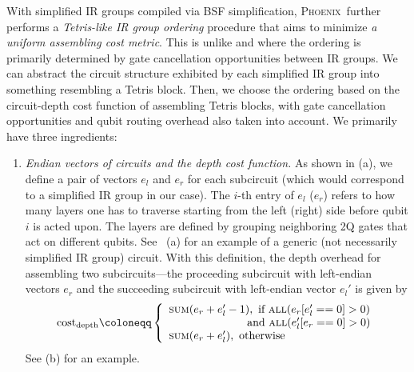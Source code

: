 \documentclass[conference,9pt]{IEEEtran}
\newcommand{\phoenix}{\textsc{Phoenix}}
\newcommand{\eRrightPre}{e_r}
\newcommand{\eLeftPost}{e_l'}
\begin{document}
    With simplified IR groups compiled via BSF simplification, \phoenix\ further performs a \emph{Tetris-like IR group ordering} procedure that aims to minimize \textit{a uniform assembling cost metric}. This is unlike \cite{li2022paulihedral} and \cite{jin2024tetris} where the ordering is primarily determined by gate cancellation opportunities between IR groups. We can abstract the circuit structure exhibited by each simplified IR group into something resembling a Tetris block. Then, we choose the ordering based on the circuit-depth cost function of assembling Tetris blocks, with gate cancellation opportunities and qubit routing overhead also taken into account. We primarily have three ingredients:
    \begin{enumerate}
        \item \textit{Endian vectors of circuits and the depth cost function.} As shown in  (a), we define a pair of vectors $e_l$ and $e_r$ for each subcircuit (which would correspond to a simplified IR group in our case). The $i$-th entry of $e_l$ ($e_r$) refers to how many layers one has to traverse starting from the left (right) side before qubit $i$ is acted upon. The layers are defined by grouping neighboring 2Q gates that act on different qubits. See~ (a) for an example of a generic (not necessarily simplified IR group) circuit.
        With this definition, the depth overhead for assembling two subcircuits---the proceeding subcircuit with left-endian vectors $e_r$ and the succeeding subcircuit with left-endian vector $e_l'$ is given by
        \begin{align*}
            \mathrm{cost}_\mathrm{depth} \coloneqq  
                    \left\{
                    \begin{array}{ll}
                    \textsc{sum}(\eRrightPre + \eLeftPost - 1),  \text{ if } \textsc{all}(\eRrightPre[\eLeftPost == 0] > 0) \\\qquad \text{    }\qquad\text{    }\qquad\text{   }\text{and }\textsc{all}(\eLeftPost[\eRrightPre == 0] > 0) \\
                    \textsc{sum}(\eRrightPre + \eLeftPost), \text{ otherwise    }
                    \end{array}
                    \right.
        \end{align*}
        See  (b) for an example. %

\end{enumerate}
\end{document}

